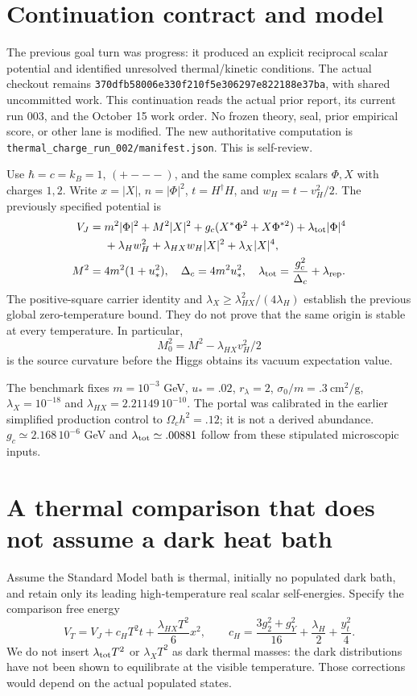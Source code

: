\documentclass[11pt]{article}
\newcommand{\lp}{\lambda_{HX}}
\newcommand{\lt}{\lambda_{\rm tot}}
\begin{document}
\section{Continuation contract and model}
The previous goal turn was progress: it produced an explicit reciprocal
scalar potential and identified unresolved thermal/kinetic conditions.
The actual checkout remains
\texttt{370dfb58006e330f210f5e306297e822188e37ba}, with shared uncommitted
work. This continuation reads the actual prior report, its current run 003,
and the October 15 work order. No frozen theory, seal, prior empirical score,
or other lane is modified. The new authoritative computation is
\texttt{thermal\_charge\_run\_002/manifest.json}. This is self-review.

Use $\hbar=c=k_B=1$, $(+---)$, and the same complex scalars $\Phi,X$ with
charges $1,2$. Write $x=|X|$, $n=|\Phi|^2$, $t=H^\dagger H$, and
$w_H=t-v_H^2/2$. The previously specified potential is
\begin{align}
 V_J={}&m^2|\Phi|^2+M^2|X|^2
 +g_c(X^*\Phi^2+X\Phi^{*2})+\lt|\Phi|^4\\
 &+\lambda_Hw_H^2+\lp w_H|X|^2+\lambda_X|X|^4,\nonumber\\
 M^2={}&4m^2(1+u_*^2),\quad \Delta_c=4m^2u_*^2,\quad
 \lt=\frac{g_c^2}{\Delta_c}+\lambda_{\rm rep}.
\end{align}
The positive-square carrier identity and
$\lambda_X\ge\lp^2/(4\lambda_H)$ establish the previous global
zero-temperature bound. They do not prove that the same origin is stable
at every temperature. In particular,
\begin{equation}
 M_0^2=M^2-\lp v_H^2/2
\end{equation}
is the source curvature before the Higgs obtains its vacuum expectation value.

The benchmark fixes $m=10^{-3}$ GeV, $u_*=.02$, $r_\lambda=2$,
$\sigma_0/m=.3\ \mathrm{cm^2/g}$, $\lambda_X=10^{-18}$ and
$\lp=2.21149\,10^{-10}$. The portal was calibrated in the earlier
simplified production control to $\Omega_c h^2=.12$; it is not a derived
abundance. $g_c\simeq2.168\,10^{-6}$ GeV and $\lt\simeq.00881$ follow
from these stipulated microscopic inputs.

\section{A thermal comparison that does not assume a dark heat bath}
Assume the Standard Model bath is thermal, initially no populated dark bath,
and retain only its leading high-temperature real scalar self-energies.
Specify the comparison free energy
\begin{equation}
 V_T=V_J+c_H T^2t+\frac{\lp T^2}{6}x^2,
 \qquad
 c_H=\frac{3g_2^2+g_Y^2}{16}+\frac{\lambda_H}{2}+\frac{y_t^2}{4}.
\label{eq:VT}
\end{equation}
We do not insert $\lt T^2$ or $\lambda_XT^2$ as dark thermal masses:
the dark distributions have not been shown to equilibrate at the visible
temperature. Those corrections would depend on the actual populated states.
\end{document}
